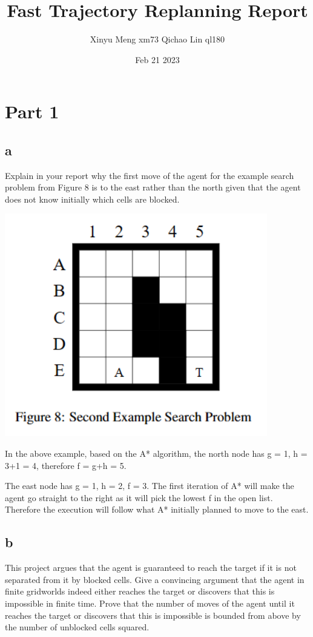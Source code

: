 \documentclass[12pt, letterpaper]{article}
\title{Fast Trajectory Replanning Report}
\author{Xinyu Meng xm73 Qichao Lin ql180}
\date{Feb 21 2023}
\begin{document}
\maketitle
\section{Part 1}
\subsection{a}

Explain in your report why the first move of the agent for the example search problem from Figure 8 is to the east rather than the north given that the agent does not know initially which cells are blocked.

\includegraphics{part1a.png} 

In the above example, based on the A* algorithm, the north node has g = 1, h = 3+1 = 4, therefore f = g+h = 5.

The east node has g = 1, h = 2, f = 3. The first iteration of A* will make the agent go straight to the right as it will pick the lowest f in the open list. Therefore the execution will follow what A* initially planned to move to the east. 

\subsection{b}

This project argues that the agent is guaranteed to reach the target if it is not separated from it by blocked cells. Give a convincing argument that the agent in finite gridworlds indeed either reaches the target or discovers that this is impossible in finite time. Prove that the number of moves of the agent until it reaches the target or discovers that this is impossible is bounded from above by the number of unblocked cells squared.
\end{document}
